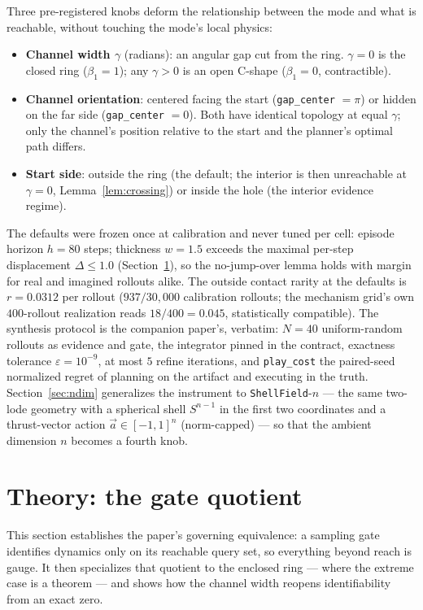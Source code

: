 \documentclass[11pt]{article}
\theoremstyle{remark}
\begin{document}
Three pre-registered knobs deform the relationship between the mode and what
is reachable, without touching the mode's local physics:
\begin{itemize}
\item \textbf{Channel width $\gamma$} (radians): an angular gap cut from
  the ring. $\gamma = 0$ is the closed ring ($\beta_1 = 1$); any
  $\gamma > 0$ is an open C-shape ($\beta_1 = 0$, contractible).
\item \textbf{Channel orientation}: centered facing the start
  (\texttt{gap\_center} $= \pi$) or hidden on the far side
  (\texttt{gap\_center} $= 0$). Both have identical topology at equal
  $\gamma$; only the channel's position relative to the start and the
  planner's optimal path differs.
\item \textbf{Start side}: outside the ring (the default; the interior is
  then unreachable at $\gamma = 0$, Lemma~\ref{lem:crossing}) or inside
  the hole (the interior evidence regime).
\end{itemize}
The defaults were frozen once at calibration and never tuned per cell:
episode horizon $h = 80$ steps; thickness $w = 1.5$ exceeds the maximal
per-step displacement
$\Delta \le 1.0$ (Section~\ref{sec:theory}), so the no-jump-over lemma
holds with margin for real and imagined rollouts alike. The outside contact
rarity at the defaults is $r = 0.0312$ per rollout ($937/30{,}000$
calibration rollouts; the mechanism grid's own $400$-rollout realization
reads $18/400 = 0.045$, statistically compatible). The synthesis protocol is
the companion paper's, verbatim: $N = 40$ uniform-random rollouts as
evidence and gate, the integrator pinned in the contract, exactness
tolerance $\varepsilon = 10^{-9}$, at most $5$ refine iterations, and
\texttt{play\_cost} the paired-seed normalized regret of planning on the
artifact and executing in the truth. Section~\ref{sec:ndim} generalizes the
instrument to \texttt{ShellField}-$n$ --- the same two-lode geometry with a
spherical shell $S^{n-1}$ in the first two coordinates and a thrust-vector
action $\vec a \in [-1, 1]^n$ (norm-capped) --- so that the ambient
dimension $n$ becomes a fourth knob.

\section{Theory: the gate quotient}
\label{sec:theory}

This section establishes the paper's governing equivalence: a sampling
gate identifies dynamics only on its reachable query set, so everything
beyond reach is gauge. It then specializes that quotient to the enclosed
ring --- where the extreme case is a theorem --- and shows how the
channel width reopens identifiability from an exact zero.
\end{document}
